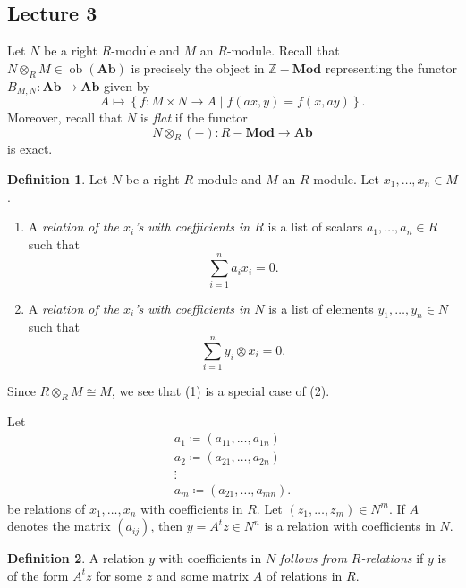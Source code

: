 \documentclass[10pt,letterpaper,cm]{nupset}
\theoremstyle{definition}
\newtheorem{definition}{Definition}[subsection]
\theoremstyle{theorem}
\theoremstyle{remark}
\newcommand{\Z}{\mathbb Z}
\newcommand{\1}{\mathbf{1}}
\newcommand{\0}{\vec 0}
\DeclareMathOperator{\ob}{ob}
\begin{document}
\subsection{Lecture 3}


Let $N$ be a right $R$-module and $M$ an $R$-module. Recall that $N \otimes_R M \in \ob(\mathbf{Ab})$ is precisely the object in $\Z{-}\mathbf{Mod}$ representing the functor $B_{M, N}: \mathbf{Ab} \to \mathbf{Ab}$ given by $$A \mapsto \left\{f:  M \times N \to A \mid f(ax, y) = f(x, ay) \right\}.$$ Moreover, recall that $N$ is \textit{flat} if the functor
\[
N \otimes_R (-) : R{-}\mathbf{Mod} \to \mathbf{Ab}
\] is exact.


\begin{definition} Let $N$ be a right $R$-module and $M$ an $R$-module. Let $x_1, \ldots, x_n \in M$.
\begin{enumerate}[label=(\arabic*)]
\item A \textit{relation of the $x_i$'s with coefficients in $R$} is a list of scalars $a_1, \ldots, a_n \in R$ such that $$\sum_{i=1}^n a_ix_i =0.$$
\item A \textit{relation of the $x_i$'s with coefficients in $N$} is a list of elements $y_1, \ldots, y_n \in N$ such that $$\sum_{i=1}^n y_i \otimes x_i =0.$$ 
\end{enumerate}
\end{definition}

Since $R \otimes_R M \cong M$, we see that (1) is a special case of (2).

\smallskip

Let
\begin{gather*}
 a_1 \coloneqq  (a_{11}, \ldots, a_{1n})
\\  a_2 \coloneqq  (a_{21}, \ldots, a_{2n})
\\  \vdots
\\  a_m \coloneqq  (a_{21}, \ldots, a_{mn}).
\end{gather*} be relations of $x_1, \ldots, x_n$ with coefficients in $R$.
Let $(z_1, \ldots, z_m)\in N^m$. If $A$ denotes the matrix $\left(a_{ij}\right)$, then $y= A^tz \in N^n$ is a relation with coefficients in $N$.


\begin{definition}
A relation $y$ with coefficients in $N$ \textit{follows from $R$-relations} if $y$ is of the form $A^tz$ for some $z$ and some matrix $A$  of relations in $R$.
\end{definition}
\end{document}
